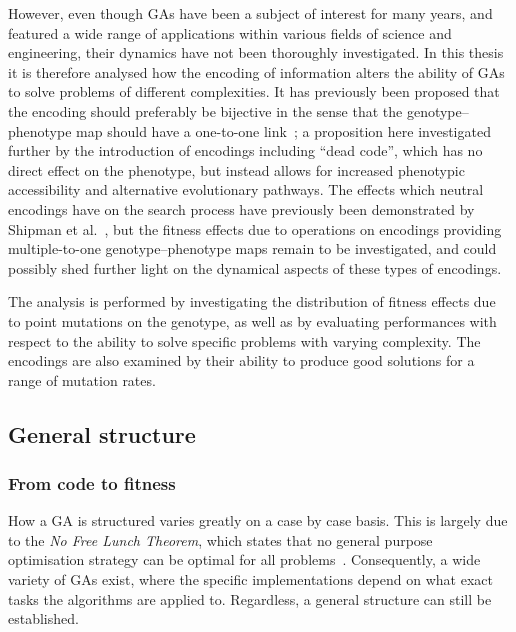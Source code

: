 \documentclass[a4paper,12pt]{article}
\theoremstyle{plain}
\theoremstyle{definition}
\begin{document}
      However, even though GAs have been a subject of interest for many years,
      and featured a wide range of applications within various fields of
      science and engineering, their dynamics have not been thoroughly
      investigated. In this thesis it is therefore analysed
      how the encoding of information alters the ability of
      GAs to solve problems of different complexities. It
      has previously been proposed that the encoding should preferably be bijective in the sense
      that the genotype--phenotype map should have a one-to-one
      link~\cite{intro_to_evol_alg, tutorial}; a proposition here investigated
      further by the introduction of encodings including ``dead code'', which
      has no direct effect on the phenotype, but instead allows for increased phenotypic accessibility
      and alternative evolutionary pathways. The effects which neutral encodings
      have on the search process have previously been demonstrated by Shipman et al.\
      \cite{Shipman2000}, but the fitness effects due to operations on encodings providing 
      multiple-to-one genotype--phenotype maps remain to be investigated, and could possibly
      shed further light on the dynamical aspects of these types of
      encodings. 

      The analysis is performed by investigating the distribution of fitness effects 
      due to point mutations on the genotype, as well as by evaluating performances 
      with respect to the ability to solve specific problems with varying
      complexity. The encodings are also examined by their ability to produce
      good solutions for a range of mutation rates.   

   \subsection{General structure}
      \subsubsection{From code to fitness}
      How a GA is structured varies greatly on a case by case basis. This is
      largely due to the \textit{No Free Lunch Theorem}, which states that no
      general purpose optimisation strategy can be optimal for all 
      problems~\cite{no_free_lunch}. Consequently, a wide variety
      of GAs exist, where the specific implementations depend 
      on what exact tasks the algorithms are applied to. Regardless, a general structure can still be established.
\end{document}
